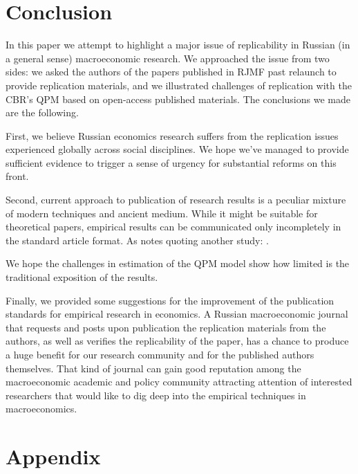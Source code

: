 \documentclass[12pt]{article}
\begin{document}
\section{Conclusion}
\label{sec:conclusion}

In this paper we attempt to highlight a major issue of replicability in Russian (in a general sense) macroeconomic research. We approached the issue from two sides: we asked the authors of the papers published in RJMF past relaunch  to provide replication materials, and we illustrated challenges of replication with the CBR's QPM based on open-access published materials. The conclusions we made are the following. 

First, we believe Russian economics research suffers from the replication issues experienced globally across social disciplines. We hope we've managed to provide sufficient evidence to trigger a sense of urgency for substantial reforms on this front. 

Second, current approach to publication of research results is a peculiar mixture of modern techniques and ancient medium. While it might be suitable for theoretical papers, empirical results can be communicated only incompletely in the standard article format. As \cite{christensen2018transparency} notes quoting another study: . 

We hope the challenges in estimation of the QPM model show how limited is the traditional exposition of the results. 

Finally, we provided some suggestions for the improvement of the publication standards for empirical research in economics. A Russian macroeconomic journal that requests and posts upon publication the replication materials from the authors, as well as verifies the replicability of the paper, has a chance to produce a huge benefit for our research community and for the published authors themselves. That kind of journal can gain good reputation among the macroeconomic academic and policy community attracting attention of interested researchers that would like to dig deep into the empirical techniques in macroeconomics. 



\newpage 
\section{Appendix}
\end{document}
